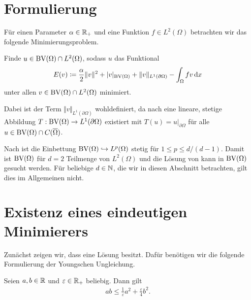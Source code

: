 \section{Formulierung}
\label{sec:continuousProblemFormulation}
Für einen Parameter $\alpha\in\mathbb{R}_+$ und eine Funktion
$f\in L^2(\Omega)$ betrachten wir das folgende Minimierungsproblem. 

\begin{problem}\label{prob:continuousProblem}
  Finde $u\in \textup{BV}(\Omega)\cap L^2(\Omega)$, sodass
  $u$ das Funktional
  \begin{align}\label{eq:continuousProblem}
    E(v)\coloneqq \frac{\alpha}{2}\Vert v\Vert^2 + |v|_{\textup{BV}(\Omega)}
    +\Vert v\Vert_{L^1(\partial\Omega)}-\int_\Omega fv\,\mathrm{d}x
  \end{align}
  unter allen $v\in\textup{BV}(\Omega)\cap L^2(\Omega)$ minimiert.

  Dabei ist der Term $\Vert v\Vert_{L^1(\partial\Omega)}$ wohldefiniert, da
  nach \cite[S. 400, Theorem 10.2.1]{ABM14} eine lineare, stetige Abbildung
  $T:\textup{BV}(\Omega)\to L^1(\partial\Omega)$ existiert mit $T(u) =
  u|_{\partial\Omega}$ für alle $u\in\textup{BV}(\Omega)\cap C(\overline\Omega)$.
\end{problem}

\begin{remark}
  Nach \cite[S. 399, Theorem 10.1.3]{ABM14} ist 
  die Einbettung $\textup{BV}(\Omega)\hookrightarrow L^p(\Omega)$ stetig für 
  $1\leq p\leq d/(d-1)$. 
  Damit ist $\textup{BV}(\Omega)$ für $d=2$ Teilmenge von $L^2(\Omega)$ und die
  Lösung von  kann in
  $\textup{BV}(\Omega)$ gesucht werden. Für beliebige $d\in\mathbb{N}$, die wir in diesen
  Abschnitt betrachten, gilt dies im Allgemeinen nicht.
\end{remark}


\section{Existenz eines eindeutigen Minimierers}
Zunächst zeigen wir, dass  eine Lösung besitzt.
Dafür benötigen wir die folgende Formulierung der Youngschen Ungleichung.

\begin{lemma}
  \label{lem:young}
  Seien $a,b\in\mathbb{R}$ und $\varepsilon\in\mathbb{R}_+$ beliebig. Dann gilt
  \begin{align*}
    ab\leq\frac{1}{\varepsilon}a^2+\frac{\varepsilon}{4}b^2. 
  \end{align*}
\end{lemma}

